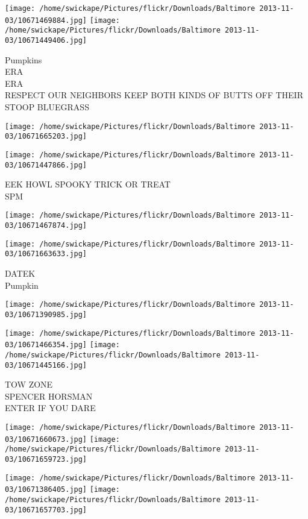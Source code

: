 \documentclass[10pt,letterpaper]{article}
\begin{document}
\texttt{[image: /home/swickape/Pictures/flickr/Downloads/Baltimore 2013-11-03/10671469884.jpg]}
\texttt{[image: /home/swickape/Pictures/flickr/Downloads/Baltimore 2013-11-03/10671449406.jpg]}

Pumpkins\\
ERA\\
ERA\\
RESPECT OUR NEIGHBORS KEEP BOTH KINDS OF BUTTS OFF THEIR STOOP BLUEGRASS\\
\pagebreak

\texttt{[image: /home/swickape/Pictures/flickr/Downloads/Baltimore 2013-11-03/10671665203.jpg]}

\vspace{0.25in}
\texttt{[image: /home/swickape/Pictures/flickr/Downloads/Baltimore 2013-11-03/10671447866.jpg]}

EEK HOWL SPOOKY TRICK OR TREAT\\
SPM\\
\pagebreak

\texttt{[image: /home/swickape/Pictures/flickr/Downloads/Baltimore 2013-11-03/10671467874.jpg]}

\vspace{0.25in}
\texttt{[image: /home/swickape/Pictures/flickr/Downloads/Baltimore 2013-11-03/10671663633.jpg]}

DATEK\\
Pumpkin\\
\pagebreak

\texttt{[image: /home/swickape/Pictures/flickr/Downloads/Baltimore 2013-11-03/10671390985.jpg]}

\vspace{0.25in}
\texttt{[image: /home/swickape/Pictures/flickr/Downloads/Baltimore 2013-11-03/10671466354.jpg]}
\texttt{[image: /home/swickape/Pictures/flickr/Downloads/Baltimore 2013-11-03/10671445166.jpg]}

TOW ZONE\\
SPENCER HORSMAN\\
ENTER IF YOU DARE\\
\pagebreak

\texttt{[image: /home/swickape/Pictures/flickr/Downloads/Baltimore 2013-11-03/10671660673.jpg]}
\texttt{[image: /home/swickape/Pictures/flickr/Downloads/Baltimore 2013-11-03/10671659723.jpg]}

\texttt{[image: /home/swickape/Pictures/flickr/Downloads/Baltimore 2013-11-03/10671386405.jpg]}
\texttt{[image: /home/swickape/Pictures/flickr/Downloads/Baltimore 2013-11-03/10671657703.jpg]}
\end{document}
